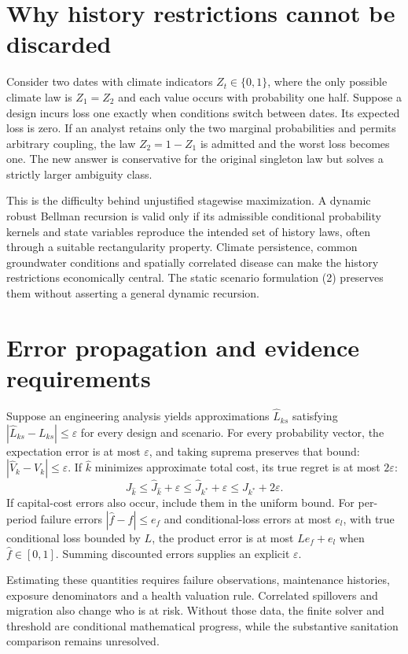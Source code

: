 \documentclass[11pt]{article}
\begin{document}
\section*{Why history restrictions cannot be discarded}
Consider two dates with climate indicators $Z_t\in\{0,1\}$, where the only possible climate law is $Z_1=Z_2$ and each value occurs with probability one half. Suppose a design incurs loss one exactly when conditions switch between dates. Its expected loss is zero. If an analyst retains only the two marginal probabilities and permits arbitrary coupling, the law $Z_2=1-Z_1$ is admitted and the worst loss becomes one. The new answer is conservative for the original singleton law but solves a strictly larger ambiguity class.

This is the difficulty behind unjustified stagewise maximization. A dynamic robust Bellman recursion is valid only if its admissible conditional probability kernels and state variables reproduce the intended set of history laws, often through a suitable rectangularity property. Climate persistence, common groundwater conditions and spatially correlated disease can make the history restrictions economically central. The static scenario formulation (2) preserves them without asserting a general dynamic recursion.

\section*{Error propagation and evidence requirements}
Suppose an engineering analysis yields approximations $\widehat L_{ks}$ satisfying $|\widehat L_{ks}-L_{ks}|\leq\varepsilon$ for every design and scenario. For every probability vector, the expectation error is at most $\varepsilon$, and taking suprema preserves that bound: $|\widehat V_k-V_k|\leq\varepsilon$. If $\widehat k$ minimizes approximate total cost, its true regret is at most $2\varepsilon$:
\[
 J_{\widehat k}\leq\widehat J_{\widehat k}+\varepsilon
 \leq\widehat J_{k^*}+\varepsilon\leq J_{k^*}+2\varepsilon.
\]
If capital-cost errors also occur, include them in the uniform bound. For per-period failure errors $|\widehat f-f|\leq e_f$ and conditional-loss errors at most $e_l$, with true conditional loss bounded by $L$, the product error is at most $Le_f+e_l$ when $\widehat f\in[0,1]$. Summing discounted errors supplies an explicit $\varepsilon$.

Estimating these quantities requires failure observations, maintenance histories, exposure denominators and a health valuation rule. Correlated spillovers and migration also change who is at risk. Without those data, the finite solver and threshold are conditional mathematical progress, while the substantive sanitation comparison remains unresolved.
\end{document}
